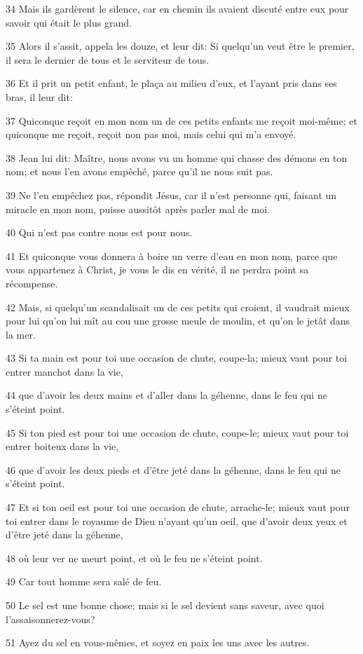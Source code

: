 \par 34 Mais ils gardèrent le silence, car en chemin ils avaient discuté entre eux pour savoir qui était le plus grand.
\par 35 Alors il s'assit, appela les douze, et leur dit: Si quelqu'un veut être le premier, il sera le dernier de tous et le serviteur de tous.
\par 36 Et il prit un petit enfant, le plaça au milieu d'eux, et l'ayant pris dans ses bras, il leur dit:
\par 37 Quiconque reçoit en mon nom un de ces petits enfants me reçoit moi-même; et quiconque me reçoit, reçoit non pas moi, mais celui qui m'a envoyé.
\par 38 Jean lui dit: Maître, nous avons vu un homme qui chasse des démons en ton nom; et nous l'en avons empêché, parce qu'il ne nous suit pas.
\par 39 Ne l'en empêchez pas, répondit Jésus, car il n'est personne qui, faisant un miracle en mon nom, puisse aussitôt après parler mal de moi.
\par 40 Qui n'est pas contre nous est pour nous.
\par 41 Et quiconque vous donnera à boire un verre d'eau en mon nom, parce que vous appartenez à Christ, je vous le dis en vérité, il ne perdra point sa récompense.
\par 42 Mais, si quelqu'un scandalisait un de ces petits qui croient, il vaudrait mieux pour lui qu'on lui mît au cou une grosse meule de moulin, et qu'on le jetât dans la mer.
\par 43 Si ta main est pour toi une occasion de chute, coupe-la; mieux vaut pour toi entrer manchot dans la vie,
\par 44 que d'avoir les deux mains et d'aller dans la géhenne, dans le feu qui ne s'éteint point.
\par 45 Si ton pied est pour toi une occasion de chute, coupe-le; mieux vaut pour toi entrer boiteux dans la vie,
\par 46 que d'avoir les deux pieds et d'être jeté dans la géhenne, dans le feu qui ne s'éteint point.
\par 47 Et si ton oeil est pour toi une occasion de chute, arrache-le; mieux vaut pour toi entrer dans le royaume de Dieu n'ayant qu'un oeil, que d'avoir deux yeux et d'être jeté dans la géhenne,
\par 48 où leur ver ne meurt point, et où le feu ne s'éteint point.
\par 49 Car tout homme sera salé de feu.
\par 50 Le sel est une bonne chose; mais si le sel devient sans saveur, avec quoi l'assaisonnerez-vous?
\par 51 Ayez du sel en vous-mêmes, et soyez en paix les uns avec les autres.

